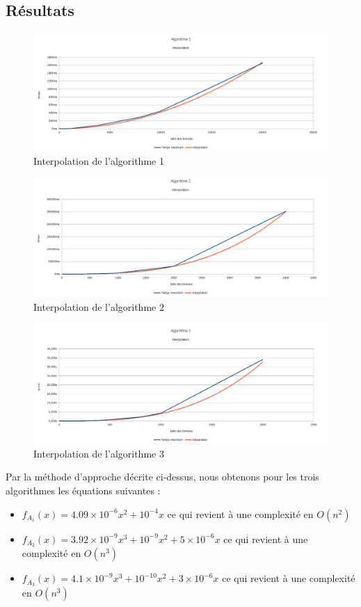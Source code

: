 \subsection{Résultats}
\begin{figure}[p]
  \includegraphics[width=\textwidth]{interpo_algo1}
  \caption{Interpolation de l'algorithme 1}
    \label{interpo1}
\end{figure}
\begin{figure}[p]
  \includegraphics[width=\textwidth]{interpo_algo2}
  \caption{Interpolation de l'algorithme 2}
    \label{interpo2}
\end{figure}
\begin{figure}[p]
  \includegraphics[width=\textwidth]{interpo_algo3}
  \caption{Interpolation de l'algorithme 3}
    \label{interpo3}
\end{figure}

Par la méthode d'approche décrite ci-dessus, nous obtenons pour les trois algorithmes les équations suivantes :
\begin{itemize}
 \item $f_{A_1}(x)=4.09\times 10^{-6} x^2 + 10^{-4}x$ ce qui revient à une complexité en $O(n^2)$ 
 \item $f_{A_2}(x)=3.92\times 10^{-9}x^3 + 10^{-9} x^2 + 5\times 10^{-6} x$ ce qui revient à une complexité en $O(n^3)$ 
  \item $f_{A_3}(x)=4.1\times 10^{-9}x^3 + 10^{-10} x^2 + 3\times 10^{-6} x$ ce qui revient à une complexité en $O(n^3)$ 
\end{itemize}

